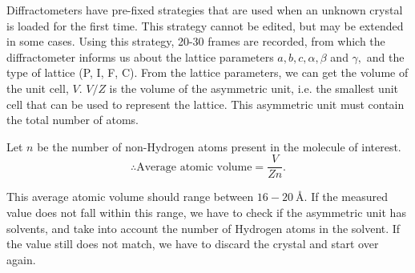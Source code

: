 Diffractometers have pre-fixed strategies that are used when an unknown crystal is loaded for the first time. This strategy cannot be edited, but may be extended in some cases. Using this strategy, 20-30 frames are recorded, from which the diffractometer informs us about the lattice parameters $a, b, c, \alpha, \beta$ and $\gamma,$ and the type of lattice (P, I, F, C). From the lattice parameters, we can get the volume of the unit cell, $V.$ $V / Z$ is the volume of the asymmetric unit, i.e. the smallest unit cell that can be used to represent the lattice. This asymmetric unit must contain the total number of atoms.

Let $n$ be the number of non-Hydrogen atoms present in the molecule of interest.%
%
\begin{equation}
\therefore \text{Average atomic volume} = \dfrac{V}{Zn}.
\end{equation}

This average atomic volume should range between $16-20~\si{\angstrom}.$ If the measured value does not fall within this range, we have to check if the asymmetric unit has solvents, and take into account the number of Hydrogen atoms in the solvent. If the value still does not match, we have to discard the crystal and start over again.